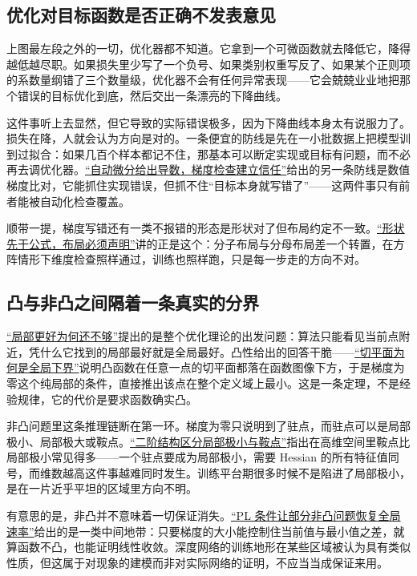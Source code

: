 \subsection{优化对目标函数是否正确不发表意见}

上图最左段之外的一切，优化器都不知道。它拿到一个可微函数就去降低它，降得越低越尽职。如果损失里少写了一个负号、如果类别权重写反了、如果某个正则项的系数量纲错了三个数量级，优化器不会有任何异常表现——它会兢兢业业地把那个错误的目标优化到底，然后交出一条漂亮的下降曲线。

这件事听上去显然，但它导致的实际错误极多，因为下降曲线本身太有说服力了。损失在降，人就会认为方向是对的。一条便宜的防线是先在一小批数据上把模型训到过拟合：如果几百个样本都记不住，那基本可以断定实现或目标有问题，而不必再去调优化器。\hyperref[sec:08-Numerical-Analysis/07-Numerical-Methods-for-ML/02]{``自动微分给出导数，梯度检查建立信任''}给出的另一条防线是数值梯度比对，它能抓住实现错误，但抓不住``目标本身就写错了''——这两件事只有前者能被自动化检查覆盖。

顺带一提，梯度写错还有一类不报错的形态是形状对了但布局约定不一致。\hyperref[sec:10-Matrix-Calculus/01-Derivative-Conventions/02]{``形状先于公式，布局必须声明''}讲的正是这个：分子布局与分母布局差一个转置，在方阵情形下维度检查照样通过，训练也照样跑，只是每一步走的方向不对。

\subsection{凸与非凸之间隔着一条真实的分界}

\hyperref[sec:09-Convex-Optimization/01-Optimization-Foundations/02]{``局部更好为何还不够''}提出的是整个优化理论的出发问题：算法只能看见当前点附近，凭什么它找到的局部最好就是全局最好。凸性给出的回答干脆——\hyperref[sec:09-Convex-Optimization/03-Convex-Functions/02]{``切平面为何是全局下界''}说明凸函数在任意一点的切平面都落在函数图像下方，于是梯度为零这个纯局部的条件，直接推出该点在整个定义域上最小。这是一条定理，不是经验规律，它的代价是要求函数确实凸。

非凸问题里这条推理链断在第一环。梯度为零只说明到了驻点，而驻点可以是局部极小、局部极大或鞍点。\hyperref[sec:09-Convex-Optimization/08-Nonconvex-and-Stochastic-Optimization/02]{``二阶结构区分局部极小与鞍点''}指出在高维空间里鞍点比局部极小常见得多——一个驻点要成为局部极小，需要 Hessian 的所有特征值同号，而维数越高这件事越难同时发生。训练平台期很多时候不是陷进了局部极小，是在一片近乎平坦的区域里方向不明。

有意思的是，非凸并不意味着一切保证消失。\hyperref[sec:09-Convex-Optimization/08-Nonconvex-and-Stochastic-Optimization/03]{``PL 条件让部分非凸问题恢复全局速率''}给出的是一类中间地带：只要梯度的大小能控制住当前值与最小值之差，就算函数不凸，也能证明线性收敛。深度网络的训练地形在某些区域被认为具有类似性质，但这属于对现象的建模而非对实际网络的证明，不应当当成保证来用。

